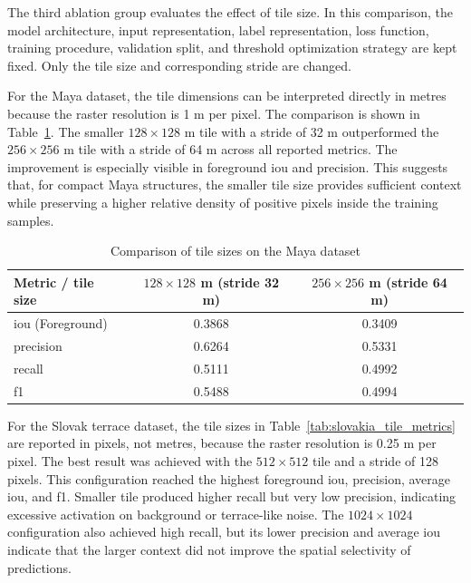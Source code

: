 The third ablation group evaluates the effect of tile size. In this comparison, the model architecture, input representation, label representation, loss function, training procedure, validation split, and threshold optimization strategy are kept fixed. Only the tile size and corresponding stride are changed.

For the Maya dataset, the tile dimensions can be interpreted directly in metres because the raster resolution is 1 m per pixel. The comparison is shown in Table~\ref{tab:maya_tile_metrics}. The smaller $128 \times 128$ m tile with a stride of 32 m outperformed the $256 \times 256$ m tile with a stride of 64 m across all reported metrics. The improvement is especially visible in foreground \gls{iou} and precision. This suggests that, for compact Maya structures, the smaller tile size provides sufficient context while preserving a higher relative density of positive pixels inside the training samples.

\begin{table}[H]
    \centering
    \caption{Comparison of tile sizes on the Maya dataset}
    \label{tab:maya_tile_metrics}
    \small
    \setlength{\tabcolsep}{6pt}
    \renewcommand{\arraystretch}{1.15}
    \begin{tabular}{lcc}
        \toprule
        \textbf{Metric / tile size} & \textbf{$128 \times 128$ m (stride 32 m)} & \textbf{$256 \times 256$ m (stride 64 m)} \\
        \midrule
        \gls{iou} (Foreground) & 0.3868 & 0.3409 \\
        precision        & 0.6264 & 0.5331 \\
        recall           & 0.5111 & 0.4992 \\
        \gls{f1}         & 0.5488 & 0.4994 \\
        \bottomrule
    \end{tabular}
\end{table}

For the Slovak terrace dataset, the tile sizes in Table~\ref{tab:slovakia_tile_metrics} are reported in pixels, not metres, because the raster resolution is 0.25 m per pixel. The best result was achieved with the $512 \times 512$ tile and a stride of 128 pixels. This configuration reached the highest foreground \gls{iou}, precision, average \gls{iou}, and \gls{f1}. Smaller tile produced higher recall but very low precision, indicating excessive activation on background or terrace-like noise. The $1024 \times 1024$ configuration also achieved high recall, but its lower precision and average \gls{iou} indicate that the larger context did not improve the spatial selectivity of predictions.

